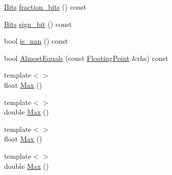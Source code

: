 \begin{DoxyCompactItemize}
\hyperlink{classtesting_1_1internal_1_1_floating_point_abf228bf6cd48f12c8b44c85b4971a731}{Bits} \hyperlink{classtesting_1_1internal_1_1_floating_point_aa0167b7b10a934b743ba3c1f47421e63}{fraction\-\_\-bits} () const 
\item 
\hyperlink{classtesting_1_1internal_1_1_floating_point_abf228bf6cd48f12c8b44c85b4971a731}{Bits} \hyperlink{classtesting_1_1internal_1_1_floating_point_a6176cc4d443724477f2799bcbd9f020a}{sign\-\_\-bit} () const 
\item 
bool \hyperlink{classtesting_1_1internal_1_1_floating_point_aaef2fd2cd8cdf791206a5e9fed8ef90d}{is\-\_\-nan} () const 
\item 
bool \hyperlink{classtesting_1_1internal_1_1_floating_point_adb0fe9ab1d9e5288f8e5550234211166}{Almost\-Equals} (const \hyperlink{classtesting_1_1internal_1_1_floating_point}{Floating\-Point} \&rhs) const 
\item 
{\footnotesize template$<$$>$ }\\float \hyperlink{classtesting_1_1internal_1_1_floating_point_af2eda9331e679229a1baa3404b57b51d}{Max} ()
\item 
{\footnotesize template$<$$>$ }\\double \hyperlink{classtesting_1_1internal_1_1_floating_point_afc2e85c0e886cb13b2300e961c9a9648}{Max} ()
\item 
{\footnotesize template$<$$>$ }\\float \hyperlink{classtesting_1_1internal_1_1_floating_point_af2eda9331e679229a1baa3404b57b51d}{Max} ()
\item 
{\footnotesize template$<$$>$ }\\double \hyperlink{classtesting_1_1internal_1_1_floating_point_afc2e85c0e886cb13b2300e961c9a9648}{Max} ()
\end{DoxyCompactItemize}
